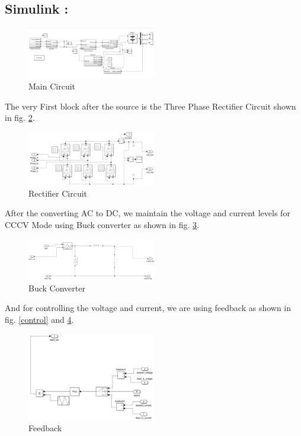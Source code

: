 \documentclass[conference]{IEEEtran}
\begin{document}
\subsection{Simulink :}
\begin{figure}[htbp]
    \centering
    \includegraphics[width=0.5\textwidth]{images/main_simu.jpeg}
    \caption{Main Circuit}
    \label{Main_Simulink_Circuit}
\end{figure}

The very First block after the source is the Three Phase Rectifier Circuit shown in fig. \ref{rectifier_circuit}.
\begin{figure}[htbp]
    \centering
    \includegraphics[width=0.5\textwidth]{images/three_phase_rectifier.jpeg}
    \caption{Rectifier Circuit}
    \label{rectifier_circuit}
\end{figure}

After the converting AC to DC, we maintain the voltage and current levels for CCCV Mode using Buck converter as shown in fig. \ref{buck_converter}.
\begin{figure}[htbp]
    \centering
    \includegraphics[width=0.5\textwidth]{images/buck_converter.jpeg}
    \caption{Buck Converter}
    \label{buck_converter}
\end{figure}

And for controlling the voltage and current, we are using feedback as shown in fig. \ref{control} and \ref{feedback}.
\begin{figure}[htbp]
    \centering
    \includegraphics[width=0.5\textwidth]{images/feedback.jpeg}
    \caption{Feedback}
    \label{feedback}
\end{figure}
\end{document}
